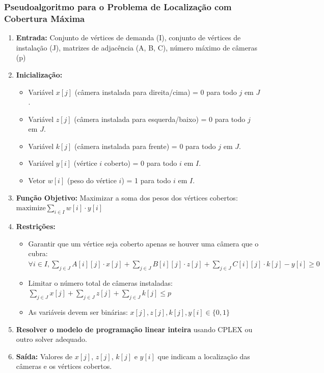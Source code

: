 \documentclass[12pt, a4paper]{report}
\begin{document}
\subsubsection{Pseudoalgoritmo para o Problema de Localização com Cobertura Máxima}
\begin{enumerate}
    \item \textbf{Entrada:} Conjunto de vértices de demanda (I), conjunto de vértices de instalação (J), matrizes de adjacência (A, B, C), número máximo de câmeras (p)
    \item \textbf{Inicialização:}
    \begin{itemize}
        \item Variável \(x[j]\) (câmera instalada para direita/cima) = 0 para todo \(j\) em \(J\).
        \item Variável \(z[j]\) (câmera instalada para esquerda/baixo) = 0 para todo \(j\) em \(J\).
        \item Variável \(k[j]\) (câmera instalada para frente) = 0 para todo \(j\) em \(J\).
        \item Variável \(y[i]\) (vértice \(i\) coberto) = 0 para todo \(i\) em \(I\).
        \item Vetor \(w[i]\) (peso do vértice \(i\)) = 1 para todo \(i\) em \(I\).
    \end{itemize}
    \item \textbf{Função Objetivo:} Maximizar a soma dos pesos dos vértices cobertos: \(\text{maximize} \sum_{i \in I} w[i] \cdot y[i]\)
    \item \textbf{Restrições:}
    \begin{itemize}
        \item Garantir que um vértice seja coberto apenas se houver uma câmera que o cubra: \(\forall i \in I, \sum_{j \in J} A[i][j] \cdot x[j] + \sum_{j \in J} B[i][j] \cdot z[j] + \sum_{j \in J} C[i][j] \cdot k[j] - y[i] \geq 0\)
        \item Limitar o número total de câmeras instaladas: \(\sum_{j \in J} x[j] + \sum_{j \in J} z[j] + \sum_{j \in J} k[j] \leq p\)
        \item As variáveis devem ser binárias: \(x[j], z[j], k[j], y[i] \in \{0, 1\}\)
    \end{itemize}
    \item \textbf{Resolver o modelo de programação linear inteira} usando CPLEX ou outro solver adequado.
    \item \textbf{Saída:} Valores de \(x[j]\), \(z[j]\), \(k[j]\) e \(y[i]\) que indicam a localização das câmeras e os vértices cobertos.
\end{enumerate}
\end{document}
